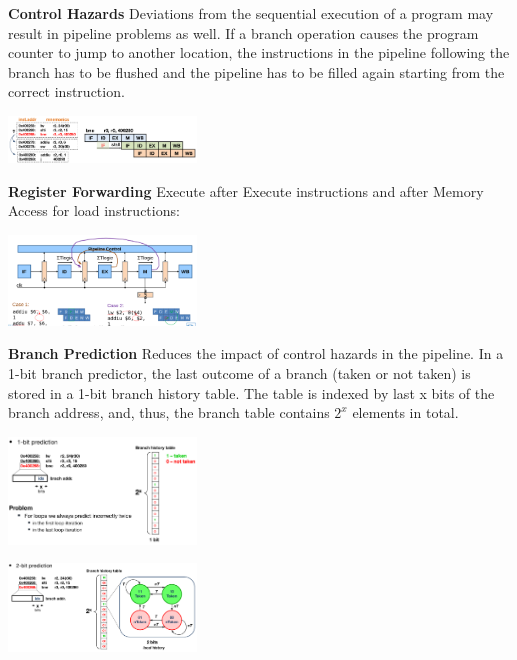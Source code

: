 \documentclass[english]{latex4ei/latex4ei_sheet}
\begin{document}
\textbf{Control Hazards} Deviations from the sequential execution of a program may result in pipeline problems as
well. If a branch operation causes the program counter to jump to another location, the instructions in the pipeline following the branch has to be flushed and the pipeline has to be filled again starting from the correct instruction.
\begin{center}
	\includegraphics[width = 5cm]{images/4.ProcessorArchitecture/ControlHazard.png}
\end{center}

\textbf{Register Forwarding}
Execute after Execute instructions and after Memory Access for load instructions:
\begin{center}
	\includegraphics[width = 5cm]{images/4.ProcessorArchitecture/RegisterForwarding.png}
\end{center}

\textbf{Branch Prediction} Reduces the impact of control hazards in the pipeline. In a 1-bit branch predictor, the last outcome of a branch (taken or not taken) is stored in a 1-bit branch history table. The table is indexed by last x bits of the branch address, and, thus, the branch table contains $2^x$ elements in total.
\begin{center}
	\includegraphics[width = 5cm]{images/4.ProcessorArchitecture/1BitPred.png}
\end{center}

\begin{center}
	\includegraphics[width = 5cm]{images/4.ProcessorArchitecture/2BitPred.png}
\end{center}
\end{document}
